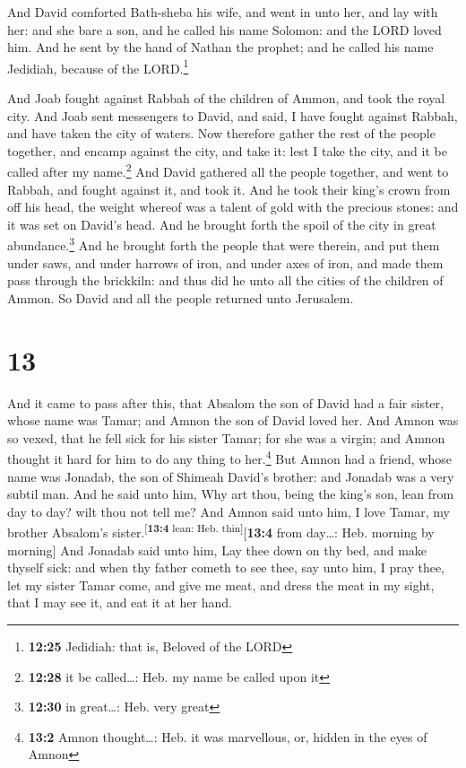  And David comforted Bath-sheba his wife, and went in
unto her, and lay with her: and she bare a son, and he called his name
Solomon: and the LORD loved him.  And he sent by the hand
of Nathan the prophet; and he called his name Jedidiah, because of the
LORD.\footnote{\textbf{12:25} Jedidiah: that is, Beloved of the LORD}

 And Joab fought against Rabbah of the children of Ammon,
and took the royal city.  And Joab sent messengers to
David, and said, I have fought against Rabbah, and have taken the city
of waters.  Now therefore gather the rest of the people
together, and encamp against the city, and take it: lest I take the
city, and it be called after my name.\footnote{\textbf{12:28} it be
  called\ldots: Heb. my name be called upon it}  And
David gathered all the people together, and went to Rabbah, and fought
against it, and took it.  And he took their king's crown
from off his head, the weight whereof was a talent of gold with the
precious stones: and it was set on David's head. And he brought forth
the spoil of the city in great abundance.\footnote{\textbf{12:30} in
  great\ldots: Heb. very great}  And he brought forth the
people that were therein, and put them under saws, and under harrows of
iron, and under axes of iron, and made them pass through the brickkiln:
and thus did he unto all the cities of the children of Ammon. So David
and all the people returned unto Jerusalem.

\hypertarget{section-12}{%
\section{13}\label{section-12}}

 And it came to pass after this, that Absalom the son of
David had a fair sister, whose name was Tamar; and Amnon the son of
David loved her.  And Amnon was so vexed, that he fell
sick for his sister Tamar; for she was a virgin; and Amnon thought it
hard for him to do any thing to her.\footnote{\textbf{13:2} Amnon
  thought\ldots: Heb. it was marvellous, or, hidden in the eyes of Amnon}
 But Amnon had a friend, whose name was Jonadab, the son
of Shimeah David's brother: and Jonadab was a very subtil man.
 And he said unto him, Why art thou, being the king's son,
lean from day to day? wilt thou not tell me? And Amnon said unto him, I
love Tamar, my brother Absalom's
sister.\textsuperscript{{[}\textbf{13:4} lean: Heb.
thin{]}}{[}\textbf{13:4} from day\ldots: Heb. morning by morning{]}
 And Jonadab said unto him, Lay thee down on thy bed, and
make thyself sick: and when thy father cometh to see thee, say unto him,
I pray thee, let my sister Tamar come, and give me meat, and dress the
meat in my sight, that I may see it, and eat it at her hand.

